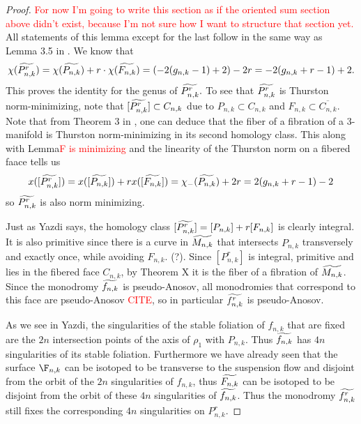 \begin{proof}
    \textcolor{red}{For now I'm going to write this section as if the oriented sum section above didn't exist, because I'm not sure how I want to structure that section yet.}
    All statements of this lemma except for the last follow in the same way as Lemma 3.5 in \cite{yazdi2018pseudo}. We know that 
    $$\chi(\widetilde{P^r_{n,k}}) = \chi(\widetilde{P_{n,k}}) + r\cdot\chi(\widetilde{F_{n,k}}) = (-2(g_{n,k} - 1) + 2)-2r = -2(g_{n,k} + r - 1) + 2.$$ This proves the identity for the genus of $\widetilde{P^r_{n,k}}.$ To see that $\widetilde{P^r_{n,k}}$ is Thurston norm-minimizing, note that $[\widetilde{P^r_{n,k}}] \subset C_{n,k}$ due to $P_{n,k} \subset C_{n,k}$ and $F_{n,k} \subset \overline{C_{n,k}}$. Note that from Theorem 3 in \cite{thurston1986norm}, one can deduce that the fiber of a fibration of a 3-manifold is Thurston norm-minimizing in its second homology class. This along with Lemma\textcolor{red}{F is minimizing} and the linearity of the Thurston norm on a fibered faace tells us
    $$x([\widetilde{P^r_{n,k}}]) = x([\widetilde{P_{n,k}}]) + rx([\widetilde{F_{n,k}}]) = \chi_-(\widetilde{P_{n,k}}) + 2r = 2(g_{n,k} + r - 1) - 2$$ so $\widetilde{P^r_{n,k}}$ is also norm minimizing.
    
    Just as Yazdi says, the homology class $[\widetilde{P^r_{n,k}}] = [P_{n,k}] + r[F_{n,k}]$ is clearly integral. It is also primitive since there is a curve in $\widetilde{M_{n,k}}$ that intersects $P_{n,k}$ transversely and exactly once, while avoiding $F_{n,k}$. (?). Since $[P^r_{n,k}]$ is integral, primitive and lies in the fibered face $C_{n,k}$, by Theorem X it is the fiber of a fibration of $\widetilde{M_{n,k}}$. Since the monodromy $\widetilde{f_{n,k}}$ is pseudo-Anosov, all monodromies that correspond to this face are pseudo-Anosov \textcolor{red}{CITE}, so in particular $\widetilde{f^r_{n,k}}$ is pseudo-Anosov. 
    
    As we see in Yazdi, the singularities of the stable foliation of $f_{n,k}$ that are fixed are the $2n$ intersection points of the axis of $\rho_1$ with $P_{n,k}$. Thus $\widetilde{f_{n,k}}$ has $4n$ singularities of its stable foliation. Furthermore we have already seen that the surface $\F_{n,k}$ can be isotoped to be transverse to the suspension flow and disjoint from the orbit of the $2n$ singularities of $f_{n,k}$, thus $\widetilde{F_{n,k}}$ can be isotoped to be disjoint from the orbit of these $4n$ singularities of $\widetilde{f_{n,k}}$. Thus the monodromy $\widetilde{f^r_{n,k}}$ still fixes the corresponding $4n$ singularities on $P^r_{n,k}$. 
    

\end{proof}
